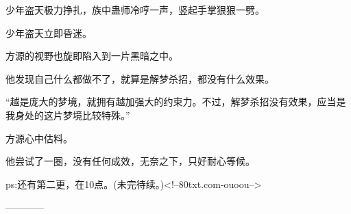 \begin{this_body}
少年盗天极力挣扎，族中蛊师冷哼一声，竖起手掌狠狠一劈。

少年盗天立即昏迷。

方源的视野也旋即陷入到一片黑暗之中。

他发现自己什么都做不了，就算是解梦杀招，都没有什么效果。

“越是庞大的梦境，就拥有越加强大的约束力。不过，解梦杀招没有效果，应当是我身处的这片梦境比较特殊。”

方源心中估料。

他尝试了一圈，没有任何成效，无奈之下，只好耐心等候。

ps:还有第二更，在10点。(未完待续。)<!--80txt.com-ouoou-->

------------

\end{this_body}

